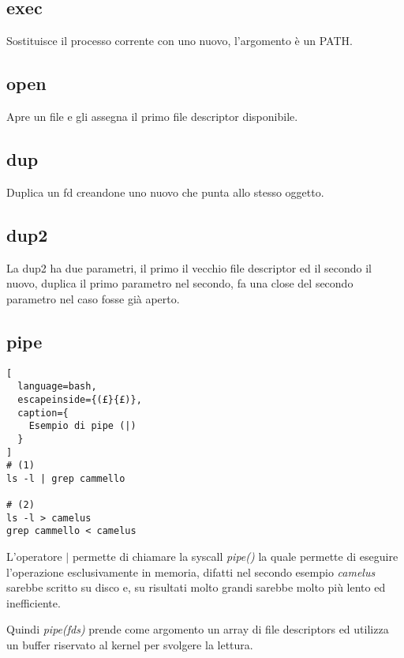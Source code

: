 \subsection{exec}
Sostituisce il processo corrente con uno nuovo, l'argomento è un PATH.

\subsection{open}
Apre un file e gli assegna il primo file descriptor disponibile.

\subsection{dup}
Duplica un fd creandone uno nuovo che punta allo stesso oggetto.

\subsection{dup2}
La dup2 ha due parametri, il primo il vecchio file descriptor ed il secondo il
nuovo, duplica il primo parametro nel secondo, fa una close del secondo
parametro nel caso fosse già aperto.

\subsection{pipe}
\begin{lstlisting}[
  language=bash,
  escapeinside={(£}{£)},
  caption={
    Esempio di pipe (|)
  }
]
# (1)
ls -l | grep cammello

# (2)
ls -l > camelus
grep cammello < camelus
\end{lstlisting}

L'operatore $|$ permette di chiamare la syscall \textit{pipe()} la quale
permette di eseguire l'operazione esclusivamente in memoria, difatti nel
secondo esempio \textit{camelus} sarebbe scritto su disco e, su risultati
molto grandi sarebbe molto più lento ed inefficiente.

Quindi \textit{pipe(fds)} prende come argomento un array di file descriptors
ed utilizza un buffer riservato al kernel per svolgere la lettura.

